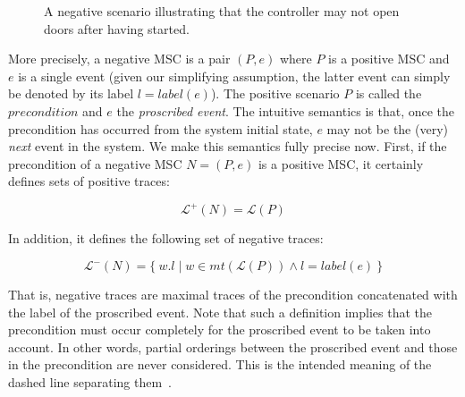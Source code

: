 \begin{figure}[H]\centering
{}
\caption{A negative scenario illustrating that the controller may not open doors after having started.\label{image:train-negative-scenario}}
\end{figure}

More precisely, a negative MSC is a pair $(P,e)$ where $P$ is a positive MSC and $e$ is a single event (given our simplifying assumption, the latter event can simply be denoted by its label $l = label(e)$). The positive scenario $P$ is called the $precondition$ and $e$ the \emph{proscribed event}. The intuitive semantics is that, once the precondition has occurred from the system initial state, $e$ may not be the (very) \emph{next} event in the system. We make this semantics fully precise now. First, if the precondition of a negative MSC $N = (P,e)$ is a positive MSC, it certainly defines sets of positive traces:

\vspace{-0.2cm}
\begin{equation*}
\mathcal{L}^{+}(N) = \mathcal{L}(P)
\end{equation*}

\noindent In addition, it defines the following set of negative traces:

\vspace{-0.2cm}
\begin{equation*}
\mathcal{L}^{-}(N) = \{~w.l \mid w \in mt(\mathcal{L}(P)) \wedge l = label(e)~\}
\end{equation*}

That is, negative traces are maximal traces of the precondition concatenated with the label of the proscribed event. Note that such a definition implies that the precondition must occur completely for the proscribed event to be taken into account. In other words, partial orderings between the proscribed event and those in the precondition are never considered. This is the intended meaning of the dashed line separating them~\cite{Uchitel:2004}. 

